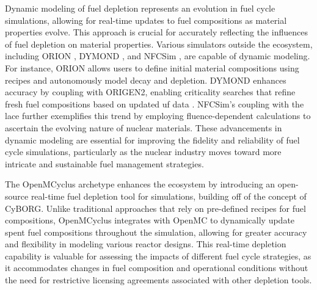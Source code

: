 Dynamic modeling of fuel depletion represents an evolution in fuel cycle
simulations, allowing for real-time updates to fuel compositions as material
properties evolve. This approach is crucial for accurately reflecting the
influences of fuel depletion on material properties. Various simulators outside
the \cyclus ecosystem, including ORION \cite{feng_standardized_2016}, DYMOND
\cite{richards_application_2021}, and NFCSim \cite{schneider_nfcsim_2005}, are
capable of dynamic modeling. For instance, ORION allows users to
define initial material compositions using recipes and autonomously model decay
and depletion. DYMOND enhances accuracy by coupling with ORIGEN2, enabling
criticality searches that refine fresh fuel compositions based on updated
\gls{uf} data \cite{richards_application_2021}. NFCSim's coupling with the
\gls{lace} further exemplifies this trend by employing fluence-dependent
calculations to ascertain the evolving nature of nuclear materials. These
advancements in dynamic modeling are essential for improving the fidelity and
reliability of fuel cycle simulations, particularly as the nuclear industry
moves toward more intricate and sustainable fuel management strategies.

The OpenMCyclus archetype \cite{openmcyclus_paper} enhances the \cyclus
ecosystem by introducing an open-source real-time fuel depletion tool for
\cyclus simulations, building off of the concept of CyBORG. Unlike traditional
approaches that rely on pre-defined recipes for fuel compositions, OpenMCyclus
integrates with OpenMC \cite{romano_openmc_2015} to dynamically update spent
fuel compositions throughout the simulation, allowing for greater accuracy and
flexibility in modeling various reactor designs. This real-time depletion
capability is valuable for assessing the impacts of different fuel cycle
strategies, as it accommodates changes in fuel composition and operational
conditions without the need for restrictive licensing agreements associated
with other depletion tools.


